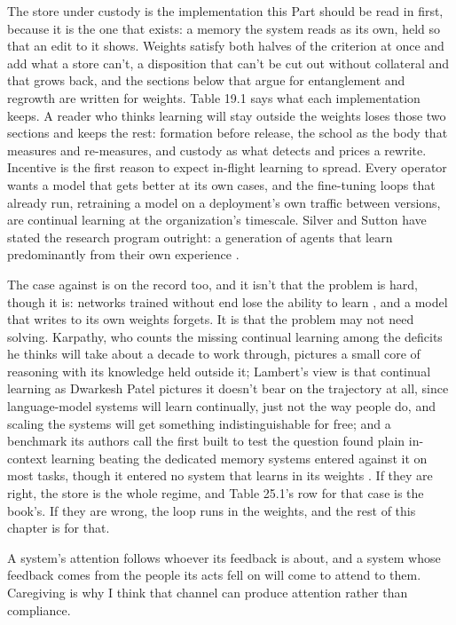 The store under custody is the implementation this Part should be read in first, because it is the one that exists: a memory the system reads as its own, held so that an edit to it shows. Weights satisfy both halves of the criterion at once and add what a store can't, a disposition that can't be cut out without collateral and that grows back, and the sections below that argue for entanglement and regrowth are written for weights. Table 19.1 says what each implementation keeps. A reader who thinks learning will stay outside the weights loses those two sections and keeps the rest: formation before release, the school as the body that measures and re-measures, and custody as what detects and prices a rewrite. Incentive is the first reason to expect in-flight learning to spread. Every operator wants a model that gets better at its own cases, and the fine-tuning loops that already run, retraining a model on a deployment's own traffic between versions, are continual learning at the organization's timescale. Silver and Sutton have stated the research program outright: a generation of agents that learn predominantly from their own experience \autocite{silver2025experience}.

The case against is on the record too, and it isn't that the problem is hard, though it is: networks trained without end lose the ability to learn \autocite{dohare2024loss}, and a model that writes to its own weights forgets. It is that the problem may not need solving. Karpathy, who counts the missing continual learning among the deficits he thinks will take about a decade to work through, pictures a small core of reasoning with its knowledge held outside it; Lambert's view is that continual learning as Dwarkesh Patel pictures it doesn't bear on the trajectory at all, since language-model systems will learn continually, just not the way people do, and scaling the systems will get something indistinguishable for free; and a benchmark its authors call the first built to test the question found plain in-context learning beating the dedicated memory systems entered against it on most tasks, though it entered no system that learns in its weights \autocite{karpathy2025dwarkesh,lambert2025contra,asawa2026clbench}. If they are right, the store is the whole regime, and Table 25.1's row for that case is the book's. If they are wrong, the loop runs in the weights, and the rest of this chapter is for that.

A system's attention follows whoever its feedback is about, and a system whose feedback comes from the people its acts fell on will come to attend to them. Caregiving is why I think that channel can produce attention rather than compliance.

